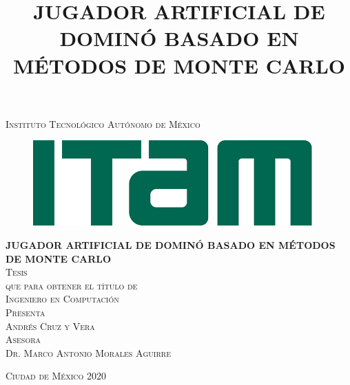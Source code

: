 \documentclass[11pt, oneside]{book}
\begin{document}

\title{ JUGADOR ARTIFICIAL DE DOMINÓ BASADO EN MÉTODOS DE MONTE CARLO} %

\begin{titlepage}
\begin{center}

\textsc{\Large Instituto Tecnológico Autónomo de México}\\[2em]

\begin{figure}[h]
\begin{center}
\includegraphics[scale=0.50]{itam_logo.png}
\end{center}
\end{figure}


\textbf{\LARGE JUGADOR ARTIFICIAL DE DOMINÓ BASADO EN MÉTODOS DE MONTE CARLO}\\[2em]

\textsc{\large Tesis}\\[1em]

\textsc{\large que para obtener el título de}\\[1em]

\textsc{\LARGE Ingeniero en Computación}\\[1em]

\textsc{\large Presenta}\\[1em]

\textsc{\LARGE Andrés Cruz y Vera}\\[1em]

\textsc{\large Asesora}\\[1em]

\textsc{\LARGE Dr. Marco Antonio Morales Aguirre}\\[2em]


\end{center}

\vspace*{\fill}
\textsc{Ciudad de México \hspace*{\fill} 2020}

\end{titlepage}
\end{document}
